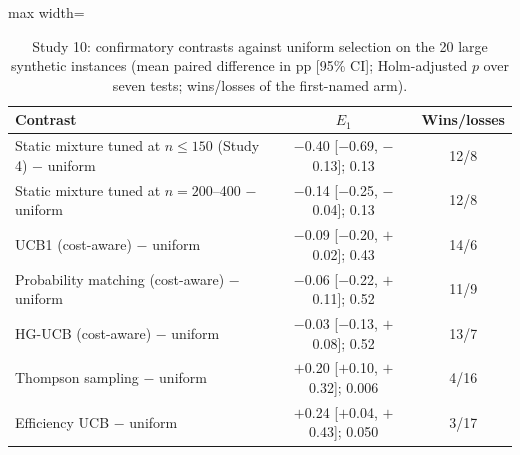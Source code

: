 \begin{table}[t]
\caption{Study 10: confirmatory contrasts against uniform selection on the 20 large synthetic instances (mean paired difference in pp [95\% CI]; Holm-adjusted $p$ over seven tests; wins/losses of the first-named arm).}\label{tab:s10tests}
\centering
\small
\begin{adjustbox}{max width=\linewidth}
\begin{tabular}{lcc}
\toprule
Contrast & $E_1$ & Wins/losses \\
\midrule
Static mixture tuned at $n\le150$ (Study 4) $-$ uniform & $-$0.40 [$-$0.69, $-$0.13]; 0.13 & 12/8 \\
Static mixture tuned at $n=200$--400 $-$ uniform & $-$0.14 [$-$0.25, $-$0.04]; 0.13 & 12/8 \\
UCB1 (cost-aware) $-$ uniform & $-$0.09 [$-$0.20, $+$0.02]; 0.43 & 14/6 \\
Probability matching (cost-aware) $-$ uniform & $-$0.06 [$-$0.22, $+$0.11]; 0.52 & 11/9 \\
HG-UCB (cost-aware) $-$ uniform & $-$0.03 [$-$0.13, $+$0.08]; 0.52 & 13/7 \\
Thompson sampling $-$ uniform & $+$0.20 [$+$0.10, $+$0.32]; 0.006 & 4/16 \\
Efficiency UCB $-$ uniform & $+$0.24 [$+$0.04, $+$0.43]; 0.050 & 3/17 \\
\bottomrule
\end{tabular}
\end{adjustbox}
\end{table}
